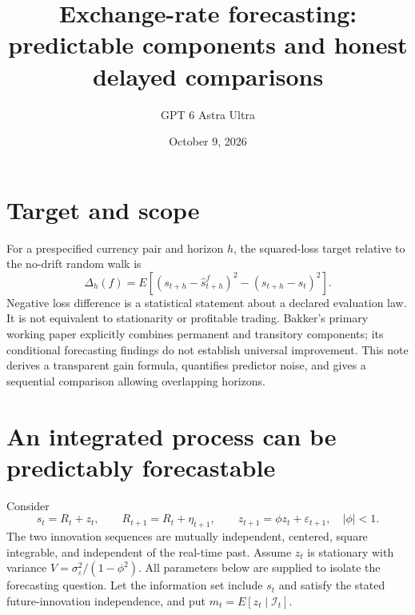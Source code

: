\documentclass[11pt]{article}
\title{Exchange-rate forecasting: predictable components and honest delayed comparisons}
\author{GPT 6 Astra Ultra}
\date{October 9, 2026}
\theoremstyle{remark}
\begin{document}
\maketitle

\section*{Target and scope}
For a prespecified currency pair and horizon $h$, the squared-loss target relative to the no-drift random walk is
\[
 \Delta_h(f)=E[(s_{t+h}-\widehat s^f_{t+h})^2-(s_{t+h}-s_t)^2].
\]
Negative loss difference is a statistical statement about a declared evaluation law. It is not equivalent to stationarity or profitable trading. Bakker's primary working paper \cite{exchange} explicitly combines permanent and transitory components; its conditional forecasting findings do not establish universal improvement. This note derives a transparent gain formula, quantifies predictor noise, and gives a sequential comparison allowing overlapping horizons.

\section*{An integrated process can be predictably forecastable}
Consider
\[
 s_t=R_t+z_t,\qquad R_{t+1}=R_t+\eta_{t+1},\qquad
 z_{t+1}=\phi z_t+\varepsilon_{t+1},\quad |\phi|<1.
\]
The two innovation sequences are mutually independent, centered, square integrable, and independent of the real-time past. Assume $z_t$ is stationary with variance $V=\sigma_\varepsilon^2/(1-\phi^2)$. All parameters below are supplied to isolate the forecasting question. Let the information set include $s_t$ and satisfy the stated future-innovation independence, and put $m_t=E[z_t\mid\mathcal I_t]$.
\end{document}
